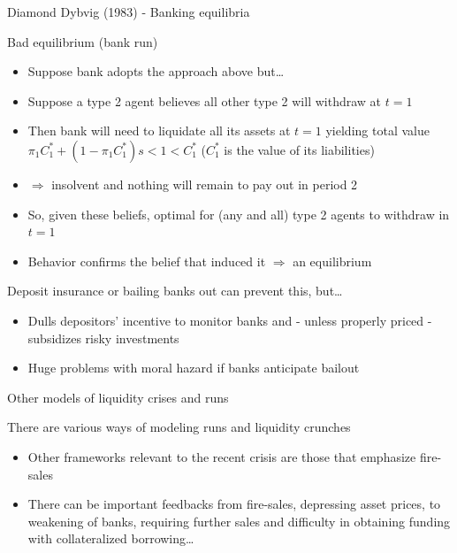 

\begin{frame}{Diamond Dybvig (1983) - Banking equilibria}

Bad equilibrium (bank run)
	\begin{itemize}
	\item	Suppose bank adopts the approach above but\ldots
	\item	Suppose a type 2 agent believes all other type 2 will withdraw at $t=1$
	\item	Then bank will need to liquidate all its assets at $t=1$ yielding total value $\pi_{1} C_{1}^{\ast} + (1-\pi_{1}C_{1}^{\ast})s < 1 < C_{1}^{\ast}$ ($C_{1}^{\ast}$ is the value of its liabilities)
	\item	$\Rightarrow$ insolvent and nothing will remain to pay out in period 2
	\item	So, given these beliefs, optimal for (any and all) type 2 agents to withdraw in $t=1$
	\item	Behavior confirms the belief that induced it $\Rightarrow$ an equilibrium
	\end{itemize}
\vspace{2mm}
Deposit insurance or bailing banks out can prevent this, but\ldots
	\begin{itemize}
	\item	Dulls depositors' incentive to monitor banks and - unless properly priced - subsidizes risky investments
	\item	Huge problems with moral hazard if banks anticipate bailout
	\end{itemize}

\end{frame}



\begin{frame}{Other models of liquidity crises and runs}

There are various ways of modeling runs and liquidity crunches
\begin{itemize}
\item	Other frameworks relevant to the recent crisis are those that emphasize fire-sales
\item	There can be important feedbacks from fire-sales, depressing asset prices, to weakening of banks, requiring further sales and difficulty in obtaining funding with collateralized borrowing\ldots
\end{itemize}

\end{frame}

